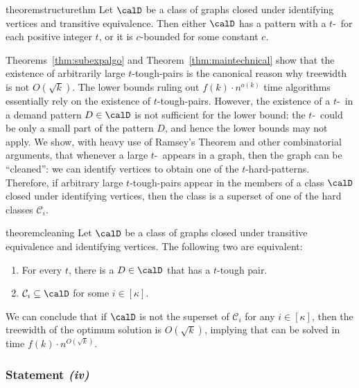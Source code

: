   \begin{restatable}{theorem}{structurethm}\label{thm:maintechnical}
Let $\calD$ be a class of graphs closed under identifying vertices and transitive equivalence. Then either $\calD$ has a pattern with a $t$-\toughpair\ for each positive integer $t$, or it is $c$-bounded for some constant $c$.
\end{restatable}
  
Theorems~\ref{thm:subexpalgo} and Theorem~\ref{thm:maintechnical} show that the existence of arbitrarily large $t$-tough-pairs is the canonical reason why treewidth is not $O(\sqrt{k})$. The lower bounds ruling out $f(k) \cdot n^{o(k)}$ time algorithms essentially rely on the existence of $t$-tough-pairs. However, the existence of a $t$-\toughpair\ in a demand pattern $D\in \calD$ is not sufficient for the lower bound: the $t$-\toughpair\ could be only a small part of the pattern $D$, and hence the lower bounds may not apply. We show, with heavy use of Ramsey's Theorem and other combinatorial arguments, that whenever a large $t$-\toughpair\ appears in a graph, then the graph can be ``cleaned'': we can identify vertices to obtain one of the $t$-hard-patterns. 
  Therefore, if arbitrary large $t$-tough-pairs appear in the members of a class $\calD$ closed under identifying vertices, then the class is a superset of one of the hard classes $\mathcal{C}_i$.

 \begin{restatable}{theorem}{cleaning}\label{thm:cleaning-intro}
   Let $\calD$ be a class of graphs closed under transitive equivalence and identifying vertices. The following two are equivalent:
    \begin{enumerate}
    \item For every $t$, there is a $D\in\calD$ that has a $t$-tough pair.
      \item $\mathcal{C}_i\subseteq \calD$ for some $i\in[\kappa]$.
    \end{enumerate}
\end{restatable}

  We can conclude that if $\calD$ is not the superset of $\mathcal{C}_i$ for any $i\in [\kappa]$, then the treewidth of the optimum solution is $O(\sqrt{k})$, implying that \dsn can be solved in time $f(k) \cdot n^{O(\sqrt{k})}$. 

\subsubsection*{Statement \textit{(iv)}}

